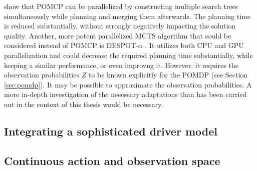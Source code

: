 \cite{pomcp-parallel} show that POMCP can be parallelized by constructing multiple search trees simultaneously while planning and merging them afterwards. The planning time is reduced substantially, without strongly negatively impacting the solution quality. Another, more potent parallelized MCTS algorithm that could be considered instead of POMCP is DESPOT-$\alpha$ \parencite{despot-a}. It utilizes both CPU and GPU parallelization and could decrease the required planning time substantially, while keeping a similar performance, or even improvng it. However, it requires the observation probabilities $Z$ to be known explicitly for the POMDP (see Section \ref{sec:pomdp}). It may be possible to approximate the observation probabilities. A more in-depth investigation of the necessary adaptations than has been carried out in the context of this thesis would be necessary.

\subsection{Integrating a sophisticated driver model}
\label{sec:complex-driver}



\subsection{Continuous action and observation space}
\label{sec:conclusion-continuous}





